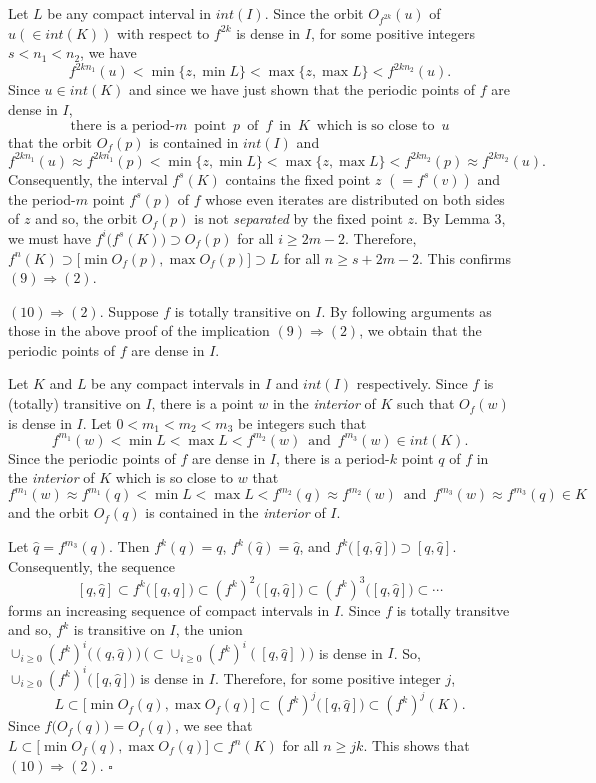 \documentclass[12pt]{article}
\newcommand{\sq}{$\square$}
\begin{document}
Let $L$ be any compact interval in $int(I)$.  Since the orbit $O_{f^{2k}}(u)$ of $u (\in int(K))$ with respect to $f^{2k}$ is dense in $I$, for some positive integers $s < n_1 < n_2$, we have$$f^{2kn_1}(u) < \min \big\{ z, \min L \big\} < \max \big\{ z, \max L \big\} < f^{2kn_2}(u).$$Since $u \in int(K)$ and since we have just shown that the periodic points of $f$ are dense in $I$,
$$
\text{there is a period-}m \,\,\, \text{point} \,\,\, p \,\,\, \text{of} \,\,\, f \,\,\, \text{in} \,\,\, K \,\,\, \text{which is so close to} \,\,\, u
$$
that the orbit $O_f(p)$ is contained in $int(I)$ and
$$
f^{2kn_1}(u) \approx f^{2kn_1}(p) < \min \big\{ z, \min L \big\} < \max \big\{ z, \max L \big\} < f^{2kn_2}(p) \approx f^{2kn_2}(u).
$$
Consequently, the interval $f^s(K)$ contains the fixed point $z$ $(= f^s(v))$ and the period-$m$ point $f^s(p)$ of $f$ whose even iterates are distributed on both sides of $z$ and so, the orbit $O_f(p)$ is not {\it separated} by the fixed point $z$. By Lemma 3, we must have $f^i\big(f^s(K)\big) \supset O_f(p)$ for all $i \ge 2m-2$.  Therefore, $f^n(K) \supset \big[\min O_f(p), \max O_f(p)\big] \supset L$ for all $n \ge s + 2m - 2$.  This confirms $(9) \Rightarrow (2)$.

$(10) \Rightarrow (2)$.  Suppose $f$ is totally transitive on $I$.  By following arguments as those in the above proof of the implication $(9) \Rightarrow (2)$, we obtain that the periodic points of $f$ are dense in $I$.  

Let $K$ and $L$ be any compact intervals in $I$ and $int(I)$ respectively.  Since $f$ is (totally) transitive on $I$, there is a point $w$ in the {\it interior} of $K$ such that $O_f(w)$ is dense in $I$.  Let $0 < m_1 < m_2 < m_3$ be integers such that $$f^{m_1}(w) < \min L < \max L < f^{m_2}(w) \,\,\, \text{and} \,\,\, f^{m_3}(w) \in int(K).$$Since the periodic points of $f$ are dense in $I$, there is a period-$k$ point $q$ of $f$ in the {\it interior} of $K$ which is so close to $w$ that $$f^{m_1}(w) \approx f^{m_1}(q) < \min L < \max L < f^{m_2}(q) \approx f^{m_2}(w) \,\,\, \text{and} \,\,\, f^{m_3}(w) \approx f^{m_3}(q) \in K$$and the orbit $O_f(q)$ is contained in the {\it interior} of $I$.    

Let $\hat q = f^{m_3}(q)$.  Then $f^k(q) = q$, $f^k(\hat q) = \hat q$, and $f^k\big([q, \hat q]\big) \supset [q, \hat q]$.  Consequently, the sequence$$[q, \hat q] \subset f^k\big([q, \hat q]\big) \subset (f^k)^2\big([q, \hat q]\big) \subset (f^k)^3\big([q, \hat q]\big) \subset \cdots$$forms an increasing sequence of compact intervals in $I$.  Since $f$ is totally transitve and so, $f^k$ is transitive on $I$, the union $\cup_{i \ge 0} (f^k)^i\big((q, \hat q)\big) \, \big(\subset \cup_{i \ge 0} (f^k)^i([q, \hat q])\big)$ is dense in $I$.  So, $\cup_{i \ge 0} (f^k)^i\big([q, \hat q]\big)$ is dense in $I$.  Therefore, for some positive integer $j$,$$L \subset \big[\min O_f(q), \max O_f(q)\big] \subset (f^k)^j\big([q, \hat q]\big) \subset (f^k)^j(K).$$Since $f\big(O_f(q)\big) = O_f(q)$, we see that $L \subset \big[\min O_f(q), \max O_f(q)\big] \subset f^n(K)$ for all $n \ge jk$.  This shows that $(10) \Rightarrow (2)$.  
\hfill\sq
\end{document}
